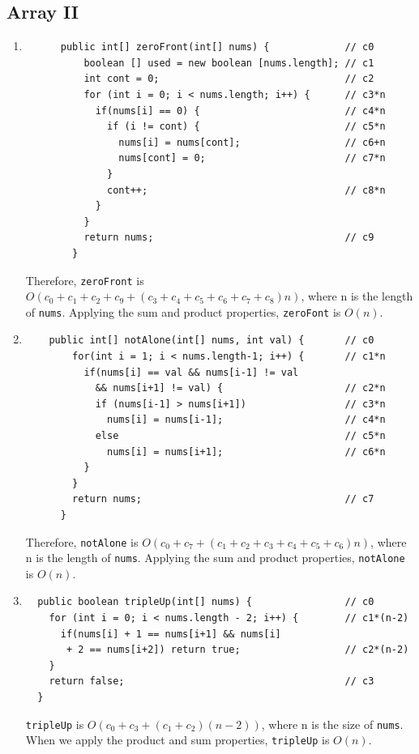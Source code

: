 \documentclass[a4paper,12pt]{article}
\begin{document}
\subsection{Array II}
  \begin{enumerate}
    \item \begin{Verbatim}
      public int[] zeroFront(int[] nums) {             // c0
          boolean [] used = new boolean [nums.length]; // c1
          int cont = 0;                                // c2
          for (int i = 0; i < nums.length; i++) {      // c3*n
            if(nums[i] == 0) {                         // c4*n
              if (i != cont) {                         // c5*n
                nums[i] = nums[cont];                  // c6+n
                nums[cont] = 0;                        // c7*n
              }
              cont++;                                  // c8*n
            }
          }
          return nums;                                 // c9
        }
    \end{Verbatim}
    Therefore, \texttt{zeroFront} is $O(c_0+c_1+c_2+c_9+(c_3+c_4+c_5+c_6+c_7+c_8)n)$,
    where n is the length of \texttt{nums}. Applying the sum and product properties,
    \texttt{zeroFont} is $O(n)$.

    \item \begin{Verbatim}
    public int[] notAlone(int[] nums, int val) {       // c0
        for(int i = 1; i < nums.length-1; i++) {       // c1*n
          if(nums[i] == val && nums[i-1] != val
            && nums[i+1] != val) {                     // c2*n
            if (nums[i-1] > nums[i+1])                 // c3*n
              nums[i] = nums[i-1];                     // c4*n
            else                                       // c5*n
              nums[i] = nums[i+1];                     // c6*n
          }
        }
        return nums;                                   // c7
      }
  \end{Verbatim}
  Therefore, \texttt{notAlone} is $O(c_0+c_7+(c_1+c_2+c_3+c_4+c_5+c_6)n)$, where n is the length of \texttt{nums}.
  Applying the sum and product properties, \texttt{notAlone} is $O(n)$.

  \item \begin{Verbatim}
  public boolean tripleUp(int[] nums) {                // c0
    for (int i = 0; i < nums.length - 2; i++) {        // c1*(n-2)
      if(nums[i] + 1 == nums[i+1] && nums[i]
       + 2 == nums[i+2]) return true;                  // c2*(n-2)
    }
    return false;                                      // c3
  }
  \end{Verbatim}
  \texttt{tripleUp} is $O(c_0+c_3+(c_1+c_2)(n-2))$, where n is the size of \texttt{nums}. When we apply the product
  and sum properties, \texttt{tripleUp} is $O(n)$.


\end{enumerate}
\end{document}
